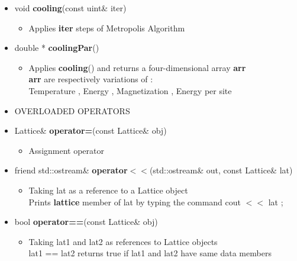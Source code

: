 \begin{itemize}
\begin{itemize}
			
			\item[] void \textbf{cooling}(const uint\& iter) 		 
			\begin{itemize}
				\item[] Applies \textbf{iter} steps of Metropolis Algorithm
			\end{itemize}
			
			\item[] double * \textbf{coolingPar}()	 
			\begin{itemize}
				\item[] Applies \textbf{cooling}() and returns a four-dimensional array \textbf{arr} \\
						\textbf{arr} are respectively variations of : \\
						Temperature , Energy , Magnetization , Energy per site  \\
			\end{itemize}
		
		\item[] 
		OVERLOADED OPERATORS \\

			\item[] Lattice\& \textbf{operator=}(const Lattice\& obj)		 
			\begin{itemize}
				\item[] Assignment operator \\
			\end{itemize}
			
			\item[] friend std::ostream\& \textbf{operator$<<$}(std::ostream\& out, const Lattice\& lat) 	
			\begin{itemize}
				\item[] Taking \textsf{lat} as a reference to a Lattice object \\
				Prints \textbf{lattice} member of \textsf{lat} by typing the command \textsf{cout $<<$ lat ;} 
			\end{itemize}	
			
			\item[] bool \textbf{operator==}(const Lattice\& obj) 		 
			\begin{itemize}
				\item[] Taking \textsf{lat1} and \textsf{lat2} as references to Lattice objects \\
						\textsf{lat1 == lat2} returns true if \textsf{lat1} and \textsf{lat2} have same data members
			\end{itemize}
			
\newpage			
			

\end{itemize}
\end{itemize}
